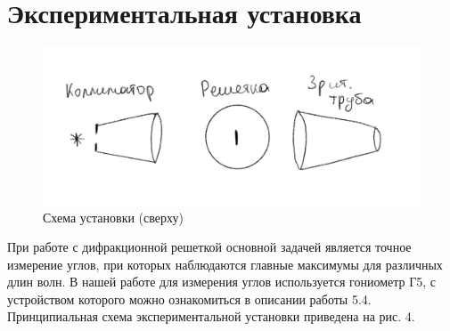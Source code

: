 \documentclass[a4paper, 12pt]{article}
\begin{document}
\section{Экспериментальная установка}
\begin{figure}[H]
    \centering
    \includegraphics[width=1\textwidth]{ris1}
    \caption{Схема установки (сверху)}
    \label{fig:set}
\end{figure}

При работе с дифракционной решеткой основной задачей является точное измерение углов, при которых наблюдаются главные максимумы для различных длин волн. В нашей работе для измерения углов используется гониометр Г5, с устройством которого можно ознакомиться в описании работы 5.4. Принципиальная схема экспериментальной установки приведена на рис. 4.
\end{document}
